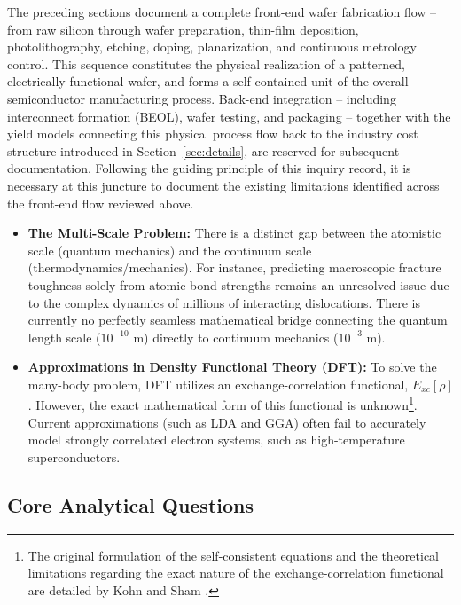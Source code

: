 \documentclass[10pt,a4paper]{article}
\begin{document}
The preceding sections document a complete front-end wafer fabrication flow -- 
from raw silicon through wafer preparation, thin-film deposition, 
photolithography, etching, doping, planarization, and continuous metrology 
control. This sequence constitutes the physical realization of a patterned, 
electrically functional wafer, and forms a self-contained unit of the overall 
semiconductor manufacturing process. Back-end integration -- including 
interconnect formation (BEOL), wafer testing, and packaging -- together with 
the yield models connecting this physical process flow back to the industry 
cost structure introduced in Section~\ref{sec:details}, are reserved for 
subsequent documentation. Following the guiding principle of this inquiry 
record, it is necessary at this juncture to document the existing limitations 
identified across the front-end flow reviewed above.
\begin{itemize}
    \item \textbf{The Multi-Scale Problem:} There is a distinct gap between the atomistic scale (quantum mechanics) and the continuum scale (thermodynamics/mechanics). For instance, predicting macroscopic fracture toughness solely from atomic bond strengths remains an unresolved issue due to the complex dynamics of millions of interacting dislocations. There is currently no perfectly seamless mathematical bridge connecting the quantum length scale ($10^{-10} \text{ m}$) directly to continuum mechanics ($10^{-3} \text{ m}$).
    \item \textbf{Approximations in Density Functional Theory (DFT):} To solve the many-body problem, DFT utilizes an exchange-correlation functional, $E_{xc}[\rho]$. However, the exact mathematical form of this functional is unknown\footnote{The original formulation of the self-consistent equations and the theoretical limitations regarding the exact nature of the exchange-correlation functional are detailed by Kohn and Sham \cite{kohn1965}.}. Current approximations (such as LDA and GGA) often fail to accurately model strongly correlated electron systems, such as high-temperature superconductors.
\end{itemize}

\subsection{Core Analytical Questions}
\end{document}
